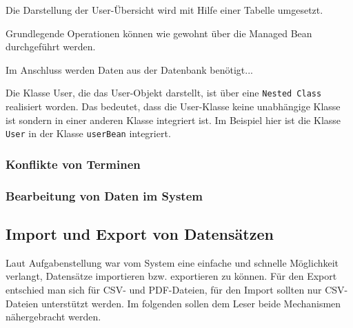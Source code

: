 Die Darstellung der User-Übersicht wird mit Hilfe einer Tabelle umgesetzt.

	

Grundlegende Operationen können wie gewohnt über die Managed Bean durchgeführt werden.

	

Im Anschluss werden Daten aus der Datenbank benötigt...
	

Die Klasse User, die das User-Objekt darstellt, ist über eine \texttt{Nested Class} realisiert worden. Das bedeutet, dass die User-Klasse keine unabhängige Klasse ist sondern in einer anderen Klasse integriert ist. Im Beispiel hier ist die Klasse \texttt{User} in  der Klasse \texttt{userBean} integriert.

	
	
\subsubsection{Konflikte von Terminen}

\subsubsection{Bearbeitung von Daten im System}

\subsection{Import und Export von Datensätzen}
Laut Aufgabenstellung war vom System eine einfache und schnelle Möglichkeit verlangt, Datensätze importieren bzw. exportieren zu können.
Für den Export entschied man sich für CSV- und PDF-Dateien, für den Import sollten nur CSV-Dateien unterstützt werden.
Im folgenden sollen dem Leser beide Mechanismen nähergebracht werden. 

